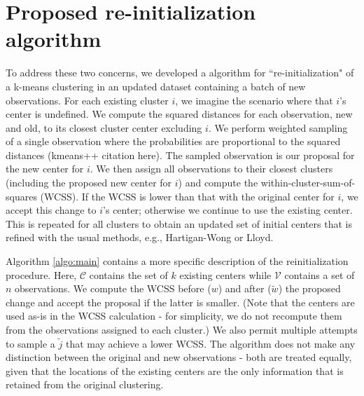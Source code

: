 \documentclass{article}
\begin{document}
\section{Proposed re-initialization algorithm}

To address these two concerns, we developed a algorithm for ``re-initialization" of a k-means clustering in an updated dataset containing a batch of new observations.
For each existing cluster $i$, we imagine the scenario where that $i$'s center is undefined.
We compute the squared distances for each observation, new and old, to its closest cluster center excluding $i$.
We perform weighted sampling of a single observation where the probabilities are proportional to the squared distances (kmeans++ citation here).
The sampled observation is our proposal for the new center for $i$.
We then assign all observations to their closest clusters (including the proposed new center for $i$) and compute the within-cluster-sum-of-squares (WCSS).
If the WCSS is lower than that with the original center for $i$, we accept this change to $i$'s center; otherwise we continue to use the existing center.
This is repeated for all clusters to obtain an updated set of initial centers that is refined with the usual methods, e.g., Hartigan-Wong or Lloyd.

Algorithm \ref{algo:main} contains a more specific description of the reinitialization procedure.
Here, $\mathcal{C}$ contains the set of $k$ existing centers while $\mathcal{V}$ contains a set of $n$ observations.
We compute the WCSS before ($w$) and after ($\tilde{w}$) the proposed change and accept the proposal if the latter is smaller.
(Note that the centers are used as-is in the WCSS calculation - for simplicity, we do not recompute them from the observations assigned to each cluster.)
We also permit multiple attempts to sample a $\tilde{j}$ that may achieve a lower WCSS.
The algorithm does not make any distinction between the original and new observations - 
both are treated equally, given that the locations of the existing centers are the only information that is retained from the original clustering. 

\renewcommand{\algorithmicrequire}{\textbf{Input:}}
\renewcommand{\algorithmicensure}{\textbf{Output:}}
\end{document}

